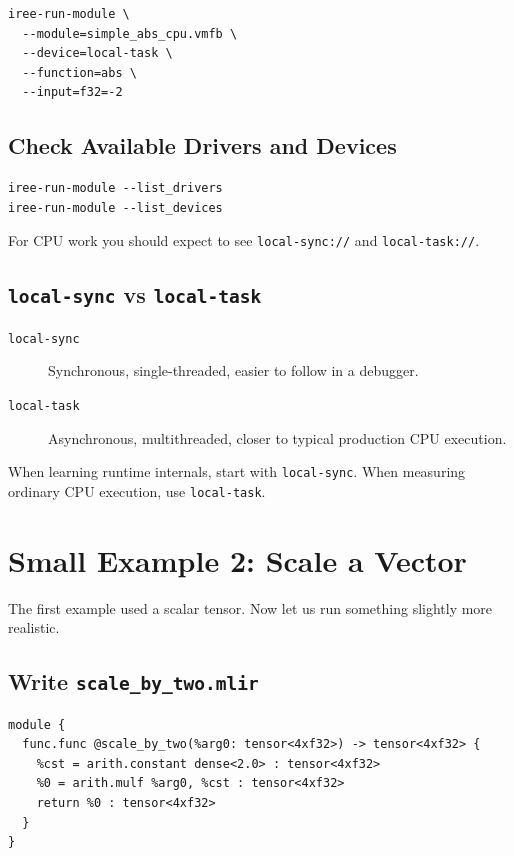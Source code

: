 \documentclass[11pt,a4paper]{article}
\begin{document}
\begin{lstlisting}[caption=Run the CPU-targeted module]
iree-run-module \
  --module=simple_abs_cpu.vmfb \
  --device=local-task \
  --function=abs \
  --input=f32=-2
\end{lstlisting}

\subsection{Check Available Drivers and Devices}

\begin{lstlisting}[caption=Inspect what the runtime can see]
iree-run-module --list_drivers
iree-run-module --list_devices
\end{lstlisting}

For CPU work you should expect to see \texttt{local-sync://} and \texttt{local-task://}.

\subsection{\texttt{local-sync} vs \texttt{local-task}}

\begin{description}
    \item[\texttt{local-sync}] Synchronous, single-threaded, easier to follow in a debugger.
    \item[\texttt{local-task}] Asynchronous, multithreaded, closer to typical production CPU execution.
\end{description}

When learning runtime internals, start with \texttt{local-sync}. When measuring ordinary CPU execution, use \texttt{local-task}.

\section{Small Example 2: Scale a Vector}

The first example used a scalar tensor. Now let us run something slightly more realistic.

\subsection{Write \texttt{scale\_by\_two.mlir}}

\begin{lstlisting}[caption=A tiny vector example]
module {
  func.func @scale_by_two(%arg0: tensor<4xf32>) -> tensor<4xf32> {
    %cst = arith.constant dense<2.0> : tensor<4xf32>
    %0 = arith.mulf %arg0, %cst : tensor<4xf32>
    return %0 : tensor<4xf32>
  }
}
\end{lstlisting}
\end{document}
